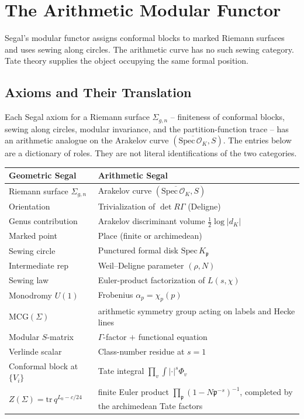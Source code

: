 \chapter{The Arithmetic Modular Functor}
\label{v4-arith:modular-functor}

Segal's modular functor assigns conformal blocks to marked Riemann
surfaces and uses sewing along circles. The arithmetic curve has no
such sewing category. Tate theory supplies the object occupying the
same formal position.

\section{Axioms and Their Translation}
\label{v4-arith:segal:axioms-translation}

Each Segal axiom for a Riemann surface \(\Sigma_{g,n}\) -- finiteness
of conformal blocks, sewing along circles, modular invariance, and the
partition-function trace -- has an arithmetic analogue on the Arakelov
curve \((\overline{\mathrm{Spec}\,\mathcal{O}_{K}},S)\). The entries
below are a dictionary of roles. They are not literal identifications
of the two categories.

\begin{convention}
\label{v4-arith:conv:arithmetic-segal-dictionary}
\begin{center}
\begin{tabular}{ll}
Geometric Segal & Arithmetic Segal \\
\hline
Riemann surface \(\Sigma_{g,n}\) & Arakelov curve \((\overline{\mathrm{Spec}\,\mathcal{O}_{K}},S)\) \\
Orientation & Trivialization of \(\det R\Gamma\) (Deligne) \\
Genus contribution & Arakelov discriminant volume \(\tfrac{1}{2}\log|d_{K}|\) \\
Marked point & Place (finite or archimedean) \\
Sewing circle & Punctured formal disk \(\mathrm{Spec}\,K_{\mathfrak{p}}\) \\
Intermediate rep & Weil--Deligne parameter \((\rho,N)\) \\
Sewing law & Euler-product factorization of \(L(s,\chi)\) \\
Monodromy \(U(1)\) & Frobenius \(\alpha_{p}=\chi_{p}(p)\) \\
\(\mathrm{MCG}(\Sigma)\) & arithmetic symmetry group acting on labels and Hecke lines \\
Modular \(S\)-matrix & \(\Gamma\)-factor \(+\) functional equation \\
Verlinde scalar & Class-number residue at \(s=1\) \\
Conformal block at \(\{V_{i}\}\) & Tate integral \(\prod_{v}\int|\cdot|^{s}\Phi_{v}\) \\
\(Z(\Sigma)=\mathrm{tr}\,q^{L_{0}-c/24}\) & finite Euler product
\(\prod_{\mathfrak p}(1-N\mathfrak p^{-s})^{-1}\), completed by the
archimedean Tate factors
\end{tabular}
\end{center}
\end{convention}

